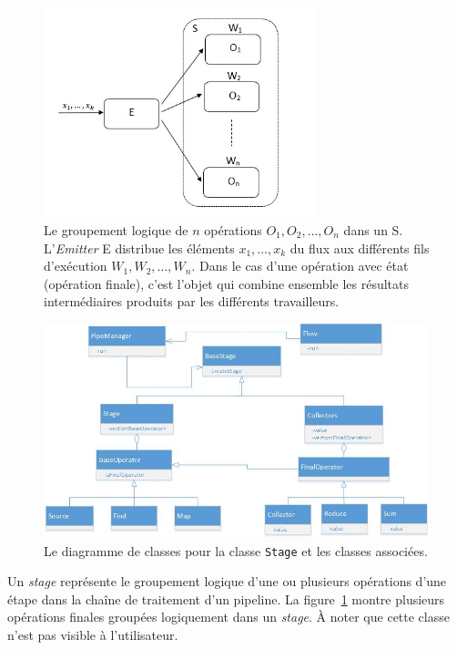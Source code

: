 \begin{figure}
\centering
     \includegraphics[width=0.7\textwidth]{Figures/Stages.jpg}
      \caption[Le groupement logique de $n$ op\'erations $O_1, O_2, \ldots, O_n$ dans un  S.]{Le groupement logique de $n$ op\'erations $O_1, O_2, \ldots, O_n$ dans un  S.  L'\emph{Emitter} E distribue les \'el\'ements $x_1, \ldots, x_k$ du flux aux diff\'erents fils d'ex\'ecution $W_1, W_2, \ldots, W_n$. Dans le cas d'une op\'eration avec \'etat (op\'eration finale), c'est l'objet  qui combine ensemble les r\'esultats interm\'ediaires produits par les diff\'erents travailleurs.}
       \label{Stages.fig}
\end{figure}

\begin{figure}
\centering
     \includegraphics[width=1.0\textwidth]{Figures/StagesClassDiagramme.jpg}
      \caption{Le diagramme de classes pour la classe \texttt{Stage} et les classes associ\'ees.}
       \label{StagesClassDiagramme.fig}
\end{figure}



Un \emph{stage} repr\'esente le groupement logique d'une ou plusieurs op\'erations d'une \'etape dans la cha\^ine de traitement d'un pipeline. La figure~\ref{Stages.fig} montre plusieurs op\'erations finales group\'ees logiquement dans un \emph{stage}.  \`A noter que cette classe n'est pas visible \`a l'utilisateur. 

